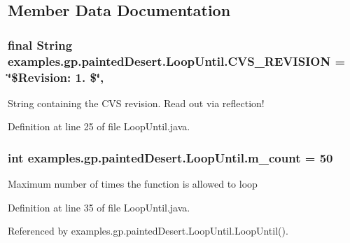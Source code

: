 \subsection{Member Data Documentation}
\hypertarget{classexamples_1_1gp_1_1painted_desert_1_1_loop_until_a4562925f5378b12b78a9e3109da98ead}{
\subsubsection[{C\-V\-S\-\_\-\-R\-E\-V\-I\-S\-I\-O\-N}]{\setlength{\rightskip}{0pt plus 5cm}final String examples.\-gp.\-painted\-Desert.\-Loop\-Until.\-C\-V\-S\-\_\-\-R\-E\-V\-I\-S\-I\-O\-N = \char`\"{}\$Revision\-: 1. \$\char`\"{}\hspace{0.3cm}{\ttfamily [static]}, {\ttfamily [private]}}}\label{classexamples_1_1gp_1_1painted_desert_1_1_loop_until_a4562925f5378b12b78a9e3109da98ead}
String containing the C\-V\-S revision. Read out via reflection! 

Definition at line 25 of file Loop\-Until.\-java.

\hypertarget{classexamples_1_1gp_1_1painted_desert_1_1_loop_until_aaeff029a79a3bdc15a85b0b34a8f6ec3}{
\subsubsection[{m\-\_\-count}]{\setlength{\rightskip}{0pt plus 5cm}int examples.\-gp.\-painted\-Desert.\-Loop\-Until.\-m\-\_\-count = 50\hspace{0.3cm}{\ttfamily [private]}}}\label{classexamples_1_1gp_1_1painted_desert_1_1_loop_until_aaeff029a79a3bdc15a85b0b34a8f6ec3}
Maximum number of times the function is allowed to loop 

Definition at line 35 of file Loop\-Until.\-java.



Referenced by examples.\-gp.\-painted\-Desert.\-Loop\-Until.\-Loop\-Until().

